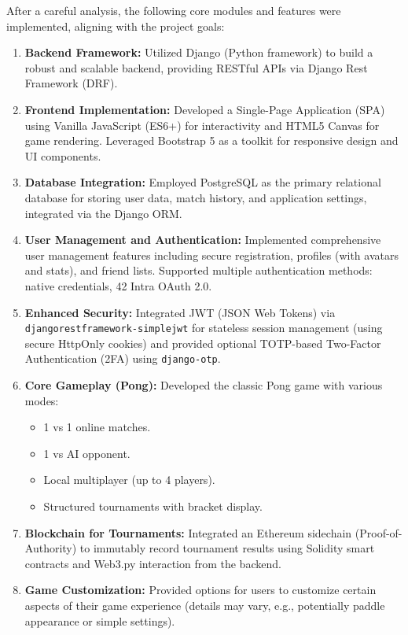 After a careful analysis, the following core modules and features were implemented, aligning with the project goals:

\begin{enumerate}
    \item \textbf{Backend Framework:} Utilized Django (Python framework) to build a robust and scalable backend, providing RESTful APIs via Django Rest Framework (DRF).
    \item \textbf{Frontend Implementation:} Developed a Single-Page Application (SPA) using Vanilla JavaScript (ES6+) for interactivity and HTML5 Canvas for game rendering. Leveraged Bootstrap 5 as a toolkit for responsive design and UI components.
    \item \textbf{Database Integration:} Employed PostgreSQL as the primary relational database for storing user data, match history, and application settings, integrated via the Django ORM.
    \item \textbf{User Management and Authentication:} Implemented comprehensive user management features including secure registration, profiles (with avatars and stats), and friend lists. Supported multiple authentication methods: native credentials, 42 Intra OAuth 2.0.
    \item \textbf{Enhanced Security:} Integrated JWT (JSON Web Tokens) via \texttt{djangorestframework-simplejwt} for stateless session management (using secure HttpOnly cookies) and provided optional TOTP-based Two-Factor Authentication (2FA) using \texttt{django-otp}.
    \item \textbf{Core Gameplay (Pong):} Developed the classic Pong game with various modes:
        \begin{itemize}
            \item 1 vs 1 online matches.
            \item 1 vs AI opponent.
            \item Local multiplayer (up to 4 players).
            \item Structured tournaments with bracket display.
        \end{itemize}
    \item \textbf{Blockchain for Tournaments:} Integrated an Ethereum sidechain (Proof-of-Authority) to immutably record tournament results using Solidity smart contracts and Web3.py interaction from the backend.
    \item \textbf{Game Customization:} Provided options for users to customize certain aspects of their game experience (details may vary, e.g., potentially paddle appearance or simple settings).

\end{enumerate}
